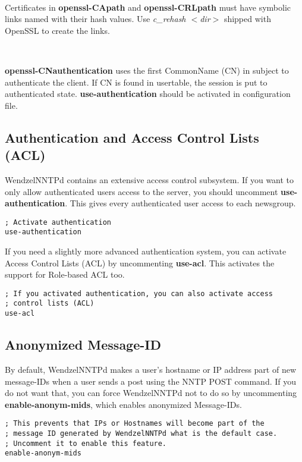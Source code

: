 ~

Certificates in \textbf{openssl-CApath} and \textbf{openssl-CRLpath} must have symbolic links named with their hash values. 
Use \textit{c\_rehash $<$dir$>$} shipped with OpenSSL to create the links.

~

\textbf{openssl-CNauthentication} uses the first CommonName (CN) in subject to authenticate the client. If CN is found in usertable, the session is put to authenticated state.
\textbf{use-authentication} should be activated in configuration file.

\subsection{Authentication and Access Control Lists (ACL)}

WendzelNNTPd contains an extensive access control subsystem. If you want to only allow authenticated users access to the server, you should uncomment \textbf{use-authentication}. This gives every authenticated user access to each newsgroup.

\begin{verbatim}
; Activate authentication
use-authentication
\end{verbatim}

If you need a slightly more advanced authentication system, you can activate Access Control Lists (ACL) by uncommenting \textbf{use-acl}. This activates the support for Role-based ACL too.

\begin{verbatim}
; If you activated authentication, you can also activate access
; control lists (ACL)
use-acl
\end{verbatim}

\subsection{Anonymized Message-ID}

By default, WendzelNNTPd makes a user's hostname or IP address part of new message-IDs when a user sends a post using the NNTP POST command. If you do not want that, you can force WendzelNNTPd not to do so by uncommenting \textbf{enable-anonym-mids}, which enables anonymized Message-IDs.

\begin{verbatim}
; This prevents that IPs or Hostnames will become part of the
; message ID generated by WendzelNNTPd what is the default case.
; Uncomment it to enable this feature.
enable-anonym-mids
\end{verbatim}

